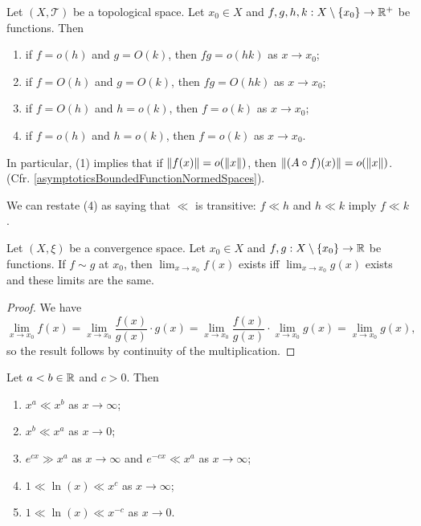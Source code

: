 \begin{lemma} \label{asymptoticTransitivity}
Let $(X,\mathcal{T})$ be a topological space. Let $x_0 \in X$ and $f,g, h,k: X\setminus\{x_0\}\to \mathbb{R}^+$ be functions. Then
\begin{enumerate}
\item if $f = o(h)$ and $g = O(k)$, then $fg = o(hk)$ as $x\to x_0$;
\item if $f = O(h)$ and $g = O(k)$, then $fg = O(hk)$ as $x\to x_0$;
\item if $f = O(h)$ and $h = o(k)$, then $f = o(k)$ as $x\to x_0$;
\item if $f = o(h)$ and $h = o(k)$, then $f = o(k)$ as $x\to x_0$.
\end{enumerate}
\end{lemma}
In particular, (1) implies that if $\lVert f(x)\rVert = o(\lVert x\rVert)$, then $\lVert(A\circ f)(x)\rVert = o(\lVert x\rVert)$. (Cfr. \ref{asymptoticsBoundedFunctionNormedSpaces}).

We can restate (4) as saying that $\ll$ is transitive: $f\ll h$ and $h \ll k$ imply $f \ll k$.

\begin{lemma} \label{asymptoticEquivalenceImpliesSameLimits}
Let $(X,\xi)$ be a convergence space. Let $x_0 \in X$ and $f,g: X\setminus\{x_0\}\to \mathbb{R}$ be functions. If $f \sim g$ at $x_0$, then $\lim_{x\to x_0} f(x)$ exists iff $\lim_{x\to x_0} g(x)$ exists and these limits are the same.
\end{lemma}
\begin{proof}
We have
\[ \lim_{x\to x_0} f(x) = \lim_{x\to x_0} \frac{f(x)}{g(x)}\cdot g(x) = \lim_{x\to x_0} \frac{f(x)}{g(x)}\cdot \lim_{x\to x_0} g(x) = \lim_{x\to x_0} g(x), \]
so the result follows by continuity of the multiplication.
\end{proof}

\begin{lemma}
Let $a<b \in \mathbb{R}$ and $c > 0$. Then
\begin{enumerate}
\item $x^a \ll x^b$ as $x\to \infty$;
\item $x^b \ll x^a$ as $x\to 0$;
\item $e^{cx} \gg x^a$ as $x\to \infty$ and $e^{-cx} \ll x^a$ as $x\to \infty$;
\item $1 \ll \ln(x) \ll x^c$ as $x\to \infty$;
\item $1 \ll \ln(x) \ll x^{-c}$ as $x\to 0$.
\end{enumerate}
\end{lemma}

